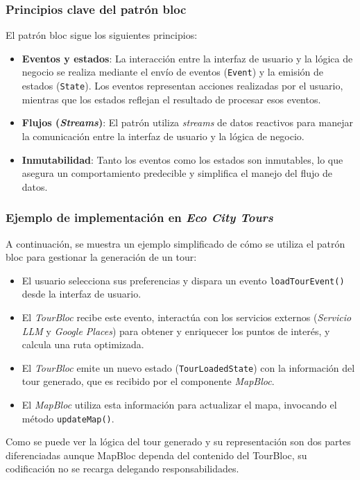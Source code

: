 \subsubsection{Principios clave del patrón \acrshort{bloc}}
	El patrón \acrfull{bloc} sigue los siguientes principios:
	\begin{itemize}
		\item \textbf{Eventos y estados}: La interacción entre la interfaz de usuario y la lógica de negocio se realiza mediante el envío de eventos (\texttt{Event}) y la emisión de estados (\texttt{State}). Los eventos representan acciones realizadas por el usuario, mientras que los estados reflejan el resultado de procesar esos eventos.
		\item \textbf{Flujos (\textit{Streams})}: El patrón utiliza \textit{streams} de datos reactivos para manejar la comunicación entre la interfaz de usuario y la lógica de negocio.
		\item \textbf{Inmutabilidad}: Tanto los eventos como los estados son inmutables, lo que asegura un comportamiento predecible y simplifica el manejo del flujo de datos.
	\end{itemize}
	

\subsubsection{Ejemplo de implementación en \textit{Eco City Tours}}
A continuación, se muestra un ejemplo simplificado de cómo se utiliza el patrón \acrshort{bloc} para gestionar la generación de un tour:
\begin{itemize}
	\item El usuario selecciona sus preferencias y dispara un evento \texttt{loadTourEvent()} desde la interfaz de usuario.
	\item El \textit{TourBloc} recibe este evento, interactúa con los servicios externos (\textit{Servicio LLM} y \textit{Google Places}) para obtener y enriquecer los puntos de interés, y calcula una ruta optimizada.
	\item El \textit{TourBloc} emite un nuevo estado (\texttt{TourLoadedState}) con la información del tour generado, que es recibido por el componente \textit{MapBloc}.
	\item El \textit{MapBloc} utiliza esta información para actualizar el mapa, invocando el método \texttt{updateMap()}.
\end{itemize}
Como se puede ver la lógica del tour generado y su representación son dos partes diferenciadas aunque MapBloc dependa del contenido del TourBloc, su codificación no se recarga delegando responsabilidades.